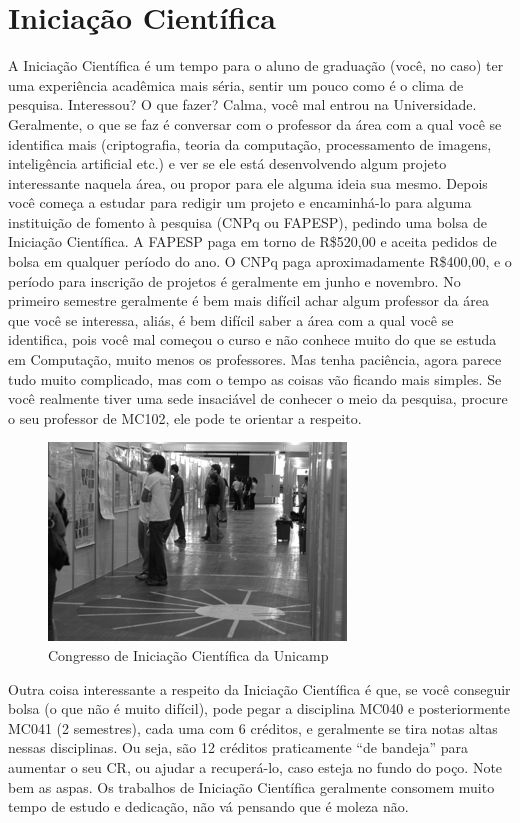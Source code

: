 
\section{Iniciação Científica}

A Iniciação Científica é um tempo para o aluno de graduação (você, no caso) ter
uma experiência acadêmica mais séria, sentir um pouco como é o clima de
pesquisa. Interessou? O que fazer? Calma, você mal entrou na Universidade.
Geralmente, o que se faz é conversar com o professor da área com a qual você se
identifica mais (criptografia, teoria da computação, processamento de imagens,
inteligência artificial etc.) e ver se ele está desenvolvendo algum projeto
interessante naquela área, ou propor para ele alguma ideia sua mesmo.
Depois você começa a estudar para redigir um projeto e encaminhá-lo para alguma
instituição de fomento à pesquisa (CNPq ou FAPESP), pedindo uma bolsa de
Iniciação Científica. A FAPESP paga em torno de R\$520,00 e aceita pedidos de bolsa em
qualquer período do ano. O CNPq paga aproximadamente R\$400,00, e o período para
inscrição de projetos é geralmente em junho e novembro. No primeiro semestre
geralmente é bem mais difícil achar algum professor da área que você se
interessa, aliás, é bem difícil saber a área com a qual você se identifica, pois
você mal começou o curso e não conhece muito do que se estuda em Computação,
muito menos os professores. Mas tenha paciência, agora parece tudo muito
complicado, mas com o tempo as coisas vão ficando mais simples. Se
você realmente tiver uma sede insaciável de conhecer o meio da pesquisa, procure
o seu professor de MC102, ele pode te orientar a respeito.
\begin{figure}[h!]
    \centering
    \includegraphics[scale=0.85, keepaspectratio=true]{img/imgs/15-iniciacao/-087.jpg}
    \caption{Congresso de Iniciação Científica da Unicamp}
\end{figure}
Outra coisa interessante a respeito da Iniciação Científica é que, se você
conseguir bolsa (o que não é muito difícil), pode pegar a disciplina MC040
e posteriormente MC041 (2 semestres), cada uma com 6 créditos, e geralmente se
tira notas altas nessas disciplinas. Ou seja, são 12 créditos praticamente ``de
bandeja'' para aumentar o seu CR, ou ajudar a recuperá-lo, caso esteja no fundo
do poço. Note bem as aspas. Os trabalhos de Iniciação Científica geralmente
consomem muito tempo de estudo e dedicação, não vá pensando que é moleza não.

